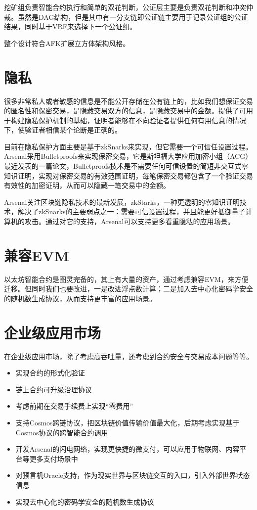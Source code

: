 \documentclass[UTF8]{ctexart}
\begin{document}
挖矿组负责智能合约执行和简单的双花判断，公证层主要是负责双花判断和冲突仲裁。虽然是DAG结构，但是其中有一分支链即公证链主要用于记录公证组的公证结果，同时基于VRF来选择下一个公证组。

整个设计符合AFK扩展立方体架构风格。

\section{隐私}

很多非常私人或者敏感的信息是不能公开存储在公有链上的，比如我们想保证交易的匿名性和保密交易，是隐藏交易双方的信息，是隐藏交易中的金额。提供了可用于构建隐私保护机制的基础，证明者能够在不向验证者提供任何有用信息的情况下，使验证者相信某个论断是正确的。

目前在隐私保护方面主要是基于zkSnarks来实现，但它需要一个可信任设置过程。Arsenal采用Bulletproofs来实现保密交易，它是斯坦福大学应用加密小组（ACG）最近发表的一篇论文，Bulletproofs技术是不需要任何可信设置的简短非交互式零知识证明，实现对保密交易的有效范围证明，每笔保密交易都包含了一个验证交易有效性的加密证明，从而可以隐藏一笔交易中的金额。

Arsenal关注区块链隐私技术的最新发展，zkStarks，一种更透明的零知识证明技术，解决了zkSnarks的主要弱点之一：需要可信设置过程，并且能更好抵御量子计算机的攻击。通过对它的支持，Arsenal可以支持更多看重隐私的应用场景。

\section{兼容EVM}

以太坊智能合约是图灵完备的，其上有大量的资产，通过考虑兼容EVM，来方便迁移。但同时我们也要改进，一是改进浮点数计算；二是加入去中心化密码学安全的随机数生成协议，从而支持更丰富的应用场景。

\section{企业级应用市场}
在企业级应用市场，除了考虑高吞吐量，还考虑到合约安全与交易成本问题等等。
\begin{itemize}
\item 实现合约的形式化验证
\item 链上合约可升级治理协议
\item 考虑前期在交易手续费上实现“零费用”
\item 支持Cosmos跨链协议，把区块链价值传输价值最大化，后期考虑实现基于Cosmos协议的跨智能合约调用
\item 开发Arsenal的闪电网络，实现更快捷的微支付，可以应用于物联网、内容平台等更多支付场景中
\item 对预言机Oracle支持，作为现实世界与区块链交互的入口，引入外部世界状态信息
\item 实现去中心化的密码学安全的随机数生成协议
\end{itemize}
\end{document}

